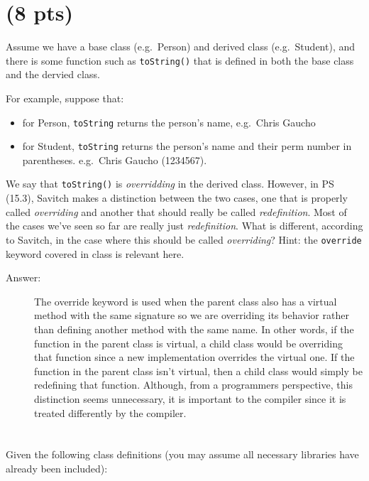 \documentclass[11pt]{article}
\begin{document}
\section{(8 pts)}
\label{sec:orga7bbaa9}
  Assume we have a base class (e.g. Person) and derived class
(e.g. Student), and there is some function such as \texttt{toString()} that is
defined in both the base class and the dervied class.

For example, suppose that:

\begin{itemize}
\item for Person, \texttt{toString} returns the person's name, e.g. Chris Gaucho
\item for Student, \texttt{toString} returns the person's name and their perm
number in parentheses. e.g. Chris Gaucho (1234567).
\end{itemize}

We say that \texttt{toString()} is \emph{overridding} in the derived class. However, in PS
(15.3), Savitch makes a distinction between the two cases, one that is properly
called \emph{overriding} and another that should really be called
\emph{redefinition}. Most of the cases we've seen so far are really just
\emph{redefinition}. What is different, according to Savitch, in the case where this
should be called \emph{overriding}? Hint: the \texttt{override} keyword covered in class is
relevant here.

\begin{description}
    \item[Answer:] The override keyword is used when the parent class also has a virtual method with the same signature so we are overriding its behavior rather than defining another method with the same name. In other words, if the function in the parent class is virtual, a child class would be overriding that function since a new implementation overrides the virtual one. If the function in the parent class isn’t virtual, then a child class would simply be redefining that function. Although, from a programmers perspective, this distinction seems unnecessary, it is important to the compiler since it is treated differently by the compiler.
\end{description}

\section{}
\label{sec:org6f17df8}

Given the following class definitions (you may assume all necessary
libraries have already been included):
\end{document}
